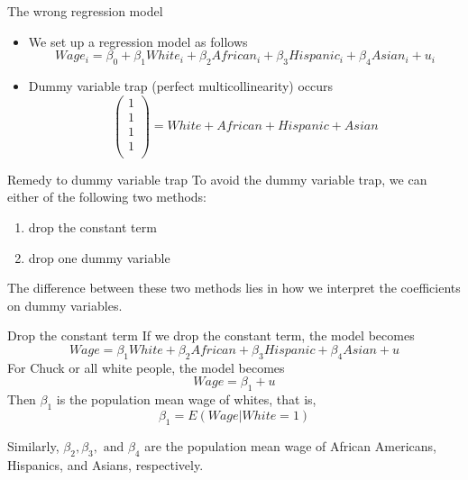 \documentclass[presentation,10pt]{beamer}
\begin{document}
\begin{frame}[label={sec:orgc02e23b}]{The wrong regression model}
\begin{itemize}
\item We set up a regression model as follows
\begin{equation}
\label{eq:dummy-trap}
Wage_i = \beta_0 + \beta_1 White_i + \beta_2 African_i + \beta_3 Hispanic_i + \beta_4 Asian_i + u_i
\end{equation}
\item Dummy variable trap (perfect multicollinearity) occurs
\begin{equation*}
\begin{pmatrix}
1 \\
1 \\
1 \\
1 \\
\end{pmatrix}
= White + African + Hispanic + Asian
\end{equation*}
\end{itemize}
\end{frame}

\begin{frame}[label={sec:orgf5adac1}]{Remedy to dummy variable trap}
To avoid the dummy variable trap, we can either of the following two
methods:
\begin{enumerate}
\item drop the constant term
\item drop one dummy variable
\end{enumerate}
The difference between these two methods lies in how we interpret the
coefficients on dummy variables.
\end{frame}

\begin{frame}[label={sec:org3331587}]{Drop the constant term}
If we drop the constant term, the model becomes
\begin{equation}
\label{eq:dummy-trap-1}
Wage = \beta_1 White + \beta_2 African + \beta_3 Hispanic + \beta_4 Asian + u
\end{equation}
For Chuck or all white people, the model becomes
\[ Wage = \beta_1 + u \]
Then \(\beta_1\) is the population mean wage of whites, that is,
\[\beta_1 = E(Wage | White = 1)\]

Similarly, \(\beta_2, \beta_3, \text{ and } \beta_4\) are the population mean wage
of African Americans, Hispanics, and Asians, respectively.
\end{frame}
\end{document}
